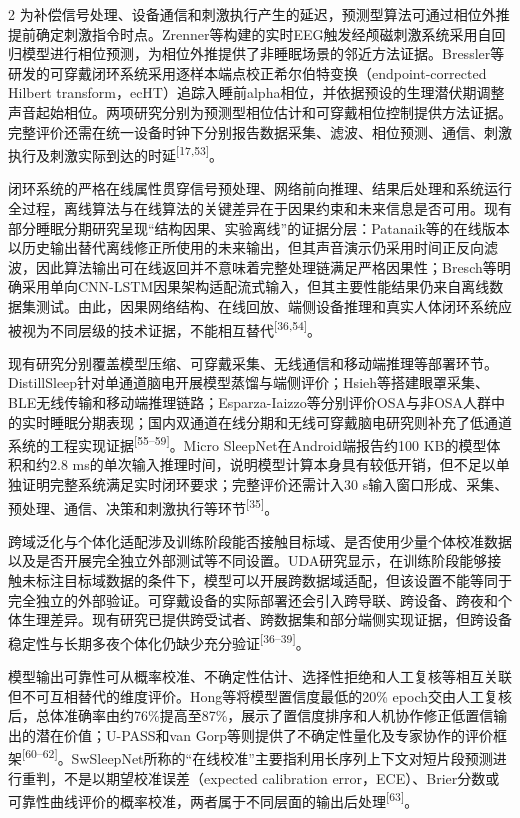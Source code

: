 \documentclass[UTF8,zihao=5,fontset=none]{ctexart}
\newcommand{\song}{\CJKfamily{song}}
\newcommand{\levelthree}[1]{%
  \par\noindent{\song\fontsize{10.5pt}{15.6pt}\selectfont #1}}
\newcommand{\refcite}[1]{\nolinebreak[4]\textsuperscript{[#1]}}
\begin{document}
\begin{multicols}{2}
为补偿信号处理、设备通信和刺激执行产生的延迟，预测型算法可通过相位外推提前确定刺激指令时点。Zrenner等构建的实时EEG触发经颅磁刺激系统采用自回归模型进行相位预测，为相位外推提供了非睡眠场景的邻近方法证据。Bressler等研发的可穿戴闭环系统采用逐样本端点校正希尔伯特变换（endpoint-corrected Hilbert transform，ecHT）追踪入睡前alpha相位，并依据预设的生理潜伏期调整声音起始相位。两项研究分别为预测型相位估计和可穿戴相位控制提供方法证据。完整评价还需在统一设备时钟下分别报告数据采集、滤波、相位预测、通信、刺激执行及刺激实际到达的时延\refcite{17,53}。\par

\levelthree{2.2.5 在线部署、输出可靠性与闭环评价体系}
闭环系统的严格在线属性贯穿信号预处理、网络前向推理、结果后处理和系统运行全过程，离线算法与在线算法的关键差异在于因果约束和未来信息是否可用。现有部分睡眠分期研究呈现“结构因果、实验离线”的证据分层：Patanaik等的在线版本以历史输出替代离线修正所使用的未来输出，但其声音演示仍采用时间正反向滤波，因此算法输出可在线返回并不意味着完整处理链满足严格因果性；Bresch等明确采用单向CNN-LSTM因果架构适配流式输入，但其主要性能结果仍来自离线数据集测试。由此，因果网络结构、在线回放、端侧设备推理和真实人体闭环系统应被视为不同层级的技术证据，不能相互替代\refcite{36,54}。\par

现有研究分别覆盖模型压缩、可穿戴采集、无线通信和移动端推理等部署环节。DistillSleep针对单通道脑电开展模型蒸馏与端侧评价；Hsieh等搭建眼罩采集、BLE无线传输和移动端推理链路；Esparza-Iaizzo等分别评价OSA与非OSA人群中的实时睡眠分期表现；国内双通道在线分期和无线可穿戴脑电研究则补充了低通道系统的工程实现证据\refcite{55--59}。Micro SleepNet在Android端报告约100 KB的模型体积和约2.8 ms的单次输入推理时间，说明模型计算本身具有较低开销，但不足以单独证明完整系统满足实时闭环要求；完整评价还需计入30 s输入窗口形成、采集、预处理、通信、决策和刺激执行等环节\refcite{35}。\par

跨域泛化与个体化适配涉及训练阶段能否接触目标域、是否使用少量个体校准数据以及是否开展完全独立外部测试等不同设置。UDA研究显示，在训练阶段能够接触未标注目标域数据的条件下，模型可以开展跨数据域适配，但该设置不能等同于完全独立的外部验证。可穿戴设备的实际部署还会引入跨导联、跨设备、跨夜和个体生理差异。现有研究已提供跨受试者、跨数据集和部分端侧实现证据，但跨设备稳定性与长期多夜个体化仍缺少充分验证\refcite{36--39}。\par

模型输出可靠性可从概率校准、不确定性估计、选择性拒绝和人工复核等相互关联但不可互相替代的维度评价。Hong等将模型置信度最低的20\% epoch交由人工复核后，总体准确率由约76\%提高至87\%，展示了置信度排序和人机协作修正低置信输出的潜在价值；U-PASS和van Gorp等则提供了不确定性量化及专家协作的评价框架\refcite{60--62}。SwSleepNet所称的“在线校准”主要指利用长序列上下文对短片段预测进行重判，不是以期望校准误差（expected calibration error，ECE）、Brier分数或可靠性曲线评价的概率校准，两者属于不同层面的输出后处理\refcite{63}。\par


\end{multicols}
\end{document}
